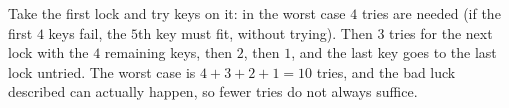 Take the first lock and try keys on it: in the worst case $4$ tries are needed (if the first $4$ keys fail, the $5$th key must fit, without trying). Then $3$ tries for the next lock with the $4$ remaining keys, then $2$, then $1$, and the last key goes to the last lock untried. The worst case is $4+3+2+1=\boxed{10}$ tries, and the bad luck described can actually happen, so fewer tries do not always suffice.
